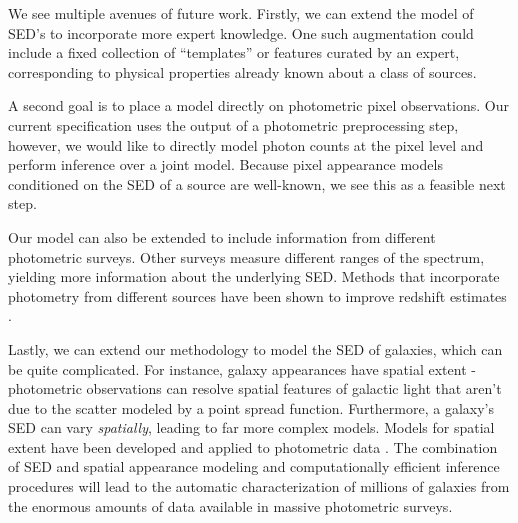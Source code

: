 \documentclass{article}
\begin{document}
We see multiple avenues of future work.  Firstly, we can extend the model of SED's to incorporate more expert knowledge.  One such augmentation could include a fixed collection of ``templates'' or features curated by an expert, corresponding to physical properties already known about a class of sources.  

A second goal is to place a model directly on photometric pixel observations.  Our current specification uses the output of a photometric preprocessing step, however, we would like to directly model photon counts at the pixel level and perform inference over a joint model. 
Because pixel appearance models conditioned on the SED of a source are well-known, we see this as a feasible next step. 

Our model can also be extended to include information from different photometric surveys.  Other surveys measure different ranges of the spectrum, yielding more information about the underlying SED.  Methods that incorporate photometry from different sources have been shown to improve redshift estimates \cite{brescia2013photometric}.  

Lastly, we can extend our methodology to model the SED of galaxies, which can be quite complicated.  For instance, galaxy appearances have spatial extent - photometric observations can resolve spatial features of galactic light that aren't due to the scatter modeled by a point spread function.  Furthermore, a galaxy's SED can vary \emph{spatially}, leading to far more complex models.  Models for spatial extent have been developed and applied to photometric data \cite{hogg2013replacing, regier2015}.  The combination of SED and spatial appearance modeling and computationally efficient inference procedures will lead to the automatic characterization of millions of galaxies from the enormous amounts of data available in massive photometric surveys.  

 





\end{document}
